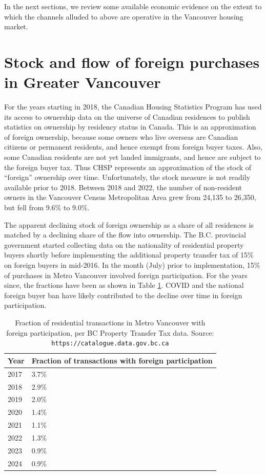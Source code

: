 \documentclass[12pt]{article}
\begin{document}
In the next sections, we review some available economic evidence on the extent to which 
the channels alluded to above are operative in the Vancouver housing market.

\section{Stock and flow of foreign purchases in Greater Vancouver}

For the years starting in 2018, the Canadian Housing Statistics Program has used its access to ownership data on the universe of Canadian residences to publish statistics on ownership by residency status in Canada. This is an approximation of foreign ownership, because some owners who live overseas are Canadian citizens or permanent residents, and hence exempt from foreign buyer taxes. Also, some Canadian residents are not yet landed immigrants, and hence are subject to the foreign buyer tax. Thus CHSP represents an approximation of the stock of ``foreign'' ownership over time. Unfortunately, the stock measure is not readily available prior to 2018. Between 2018 and 2022, the number of non-resident owners in the Vancouver Census Metropolitan Area grew from 24,135 to 26,350, but fell from 9.6\% to 9.0\%.

The apparent declining stock of foreign ownership as a share of all residences
is matched by a declining share of the flow into ownership. The B.C. provincial
government started collecting data on the nationality of residential property
buyers shortly before implementing the additional property transfer tax of 15\%
on foreign buyers in mid-2016. In the month (July) prior to implementation,
15\% of purchases in Metro Vancouver involved foreign participation. For the
years since, the fractions have been as shown in Table \ref{tab:fbt}. COVID and
the national foreign buyer ban have likely contributed to the decline over time
in foreign participation.

\begin{table}
	\caption{\label{tab:fbt} Fraction of residential transactions in Metro Vancouver with foreign participation, per BC Property Transfer Tax data. Source: \texttt{https://catalogue.data.gov.bc.ca}}
	\begin{tabular}{ll}
		\hline
		Year & Fraction of transactions with foreign participation \\
		\hline\hline
		2017 & 3.7\% \\
		2018 & 2.9\% \\
		2019 & 2.0\%\\
		2020 & 1.4\%\\
		2021 & 1.1\%\\
		2022 & 1.3\%\\
		2023 & 0.9\%\\
		2024 & 0.9\%\\
		\hline
	\end{tabular}
\end{table}
\end{document}

